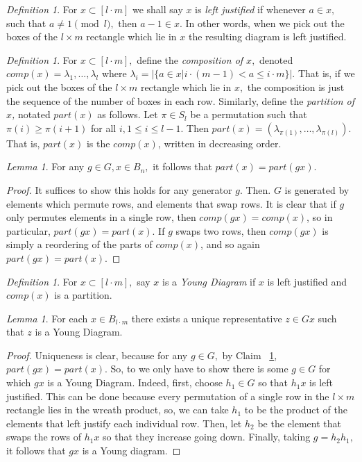 \documentclass[10 pt]{amsart}
\theoremstyle{plain}
\theoremstyle{definition}
\theoremstyle{remark}
\numberwithin{equation}{section}
\newtheorem{lem}[thm]{Lemma}
\theoremstyle{remark}
\newtheorem{defn}[thm]{Definition}
\begin{document}
\begin{defn}
For $x \subset [l \cdot m]$ we shall say $x$ is {\it left justified} if whenever $a \in x,$ such that $a \neq 1 \pmod l,$ then $a -1 \in x.$ In other words, when we pick out the boxes of the $l\times m$ rectangle which lie in $x$ the resulting diagram is left justified.
\end{defn}

\begin{defn}
For $x \subset [l\cdot m],$ define the {\it composition of $x,$} denoted $comp(x) = \lambda_1 ,\ldots, \lambda_l$ where $\lambda_i = |\{a \in x|i\cdot (m-1)< a \leq i \cdot m\}|.$ That is, if we pick out the boxes of the $l \times m$ rectangle which lie in $x,$ the composition is just the sequence of the number of boxes in each row. Similarly, define the {\it partition of $x$,} notated $part(x)$ as follows. Let $\pi \in S_l$ be a permutation such that $\pi(i) \geq \pi(i+1)$ for all $i,1\leq i \leq l-1.$ Then  $part(x) = (\lambda_{\pi(1)},\ldots, \lambda_{\pi(l)}).$ That is, $part(x)$ is the $comp(x)$, written in decreasing order.
\end{defn}

\begin{lem}
\label{lem:comp_invariance}
For any $g \in G, x \in B_n,$ it follows that $part(x) = part(gx).$
\end{lem}
\begin{proof}
It suffices to show this holds for any generator $g.$ Then. $G$ is generated by elements which permute rows, and elements that swap rows. It is clear that if $g$ only permutes elements in a single row, then $comp(gx) = comp(x)$, so in particular, $part(gx) = part(x).$ If $g$ swaps two rows, then $comp(gx)$ is simply a reordering of the parts of $comp(x)$, and so again $part(gx) = part(x).$
\end{proof}

\begin{defn}
For $x \subset [l\cdot m],$ say $x$ is a {\it Young Diagram} if $x$ is left justified and $comp(x)$ is a partition.
\end{defn}

\begin{lem}
\label{lem:young_diag_reps}
For each $x \in B_{l\cdot m}$ there exists a unique representative $z \in Gx$ such that $z$ is a Young Diagram.
\end{lem}
\begin{proof}
Uniqueness is clear, because for any $g \in G,$ by Claim ~\ref{lem:comp_invariance}, $part(gx) = part(x).$ So, to we only have to show there is some $g \in G$ for which $gx$ is a Young Diagram. Indeed, first, choose $h_1 \in G$ so that $h_1x$ is left justified. This can be done because every permutation of a single row in the $l\times m$ rectangle lies in the wreath product, so, we can take $h_1$ to be the product of the elements that left justify each individual row. Then, let $h_2$ be the element that swaps the rows of $h_1x$ so that they increase going down. Finally, taking $g = h_2 h_1,$ it follows that $gx$ is a Young diagram. 
\end{proof}
\end{document}
